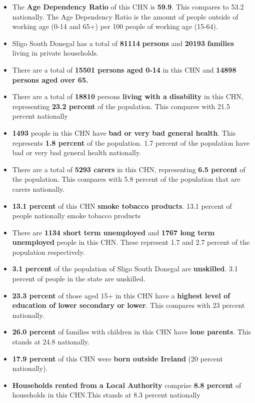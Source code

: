\documentclass{article}
\begin{document}
\begin{itemize}

\item The \textbf{Age Dependency Ratio} of this CHN is  \textbf{59.9}. This compares to 53.2 nationally. The Age Dependency Ratio is the amount of people outside of working age (0-14 and 65+) per 100 people of working age (15-64). 

\item Sligo South Donegal has a total of \textbf{\num{81114}} \textbf{persons} and  \textbf{\num{20193}} \textbf{families} living in private households.

\item There are a total of \textbf{\num{15501} persons aged 0-14} in this CHN and \textbf{\num{14898} persons aged over 65.} 

\item There are a total of \textbf{\num{18810}} persons \textbf{living with a disability} in this CHN, representing \textbf{23.2 percent} of the population. This compares with  21.5 percent nationally

\item \textbf{\num{1493}} people in this CHN have \textbf{bad or very bad general health}. This represents \textbf{1.8 percent} of the population. 1.7 percent of the population have bad or very bad general health nationally. 

\item There are a total of \textbf{\num{5293} carers} in this CHN, representing \textbf{6.5 percent} of the population. This compares with 5.8 percent of the population that are carers nationally. 

\item \textbf{13.1 percent} of this CHN \textbf{smoke tobacco products}. 13.1 percent of people nationally smoke tobacco products

\item There are \textbf{\num{1134} short term unemployed} and \textbf{\num{1767} long term unemployed} people in this CHN. These represent 1.7 and 2.7 percent of the population respectively.

\item  \textbf{3.1 percent} of the population of Sligo South Donegal are \textbf{unskilled}. 3.1 percent of people in the state are unskilled.

\item \textbf{23.3 percent} of those aged 15+ in this CHN have a \textbf{highest level of education of lower secondary or lower}. This compares with 23 percent nationally. 

\item \textbf{26.0 percent} of families with children in this CHN have \textbf{lone parents}. This stands at 24.8 nationally.

\item \textbf{17.9 percent} of this CHN were \textbf{born outside Ireland} (20 percent nationally).

\item \textbf{Households rented from a Local Authority} comprise \textbf{8.8 percent} of households in this CHN.This stands at 8.3 percent nationally

\end{itemize}
\end{document}
